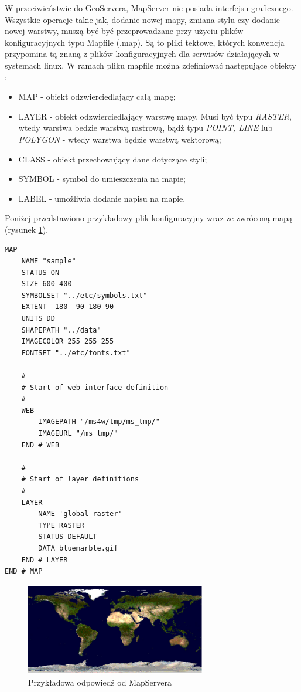 W przeciwieństwie do GeoServera, MapServer nie posiada interfejsu graficznego. Wszystkie operacje takie jak,
dodanie nowej mapy, zmiana stylu czy dodanie nowej warstwy, muszą być być przeprowadzane przy użyciu plików
konfiguracyjnych typu Mapfile (.map). Są to pliki tektowe, których konwencja przypomina tą znaną z plików
konfiguracyjnych dla serwisów działających w systemach linux. W ramach pliku mapfile można zdefiniować następujące
obiekty \cite{MapServer2011}:
\begin{itemize}
    \item MAP - obiekt odzwierciedlający całą mapę;
    \item LAYER - obiekt odzwierciedlający warstwę mapy. Musi być typu \textit{RASTER}, wtedy warstwa bedzie warstwą rastrową,
        bądź typu \textit{POINT, LINE} lub \textit{POLYGON} - wtedy warstwa będzie warstwą wektorową;
    \item CLASS - obiekt przechowujący dane dotyczące styli;
    \item SYMBOL - symbol do umieszczenia na mapie;
    \item LABEL - umożliwia dodanie napisu na mapie.
\end{itemize}

Poniżej przedstawiono przykładowy plik konfiguracyjny wraz ze zwróconą mapą (rysunek \ref{fig:mapserver_config}).

\begin{lstlisting}[frame=L]
MAP
    NAME "sample"
    STATUS ON
    SIZE 600 400
    SYMBOLSET "../etc/symbols.txt"
    EXTENT -180 -90 180 90
    UNITS DD
    SHAPEPATH "../data"
    IMAGECOLOR 255 255 255
    FONTSET "../etc/fonts.txt"

    #
    # Start of web interface definition
    #
    WEB
        IMAGEPATH "/ms4w/tmp/ms_tmp/"
        IMAGEURL "/ms_tmp/"
    END # WEB

    #
    # Start of layer definitions
    #
    LAYER
        NAME 'global-raster'
        TYPE RASTER
        STATUS DEFAULT
        DATA bluemarble.gif
    END # LAYER
END # MAP
\end{lstlisting}

\begin{figure}[h!]
    \centering
    \includegraphics[width=0.7\textwidth]{img/mapserver_config.jpg}
    \caption{Przykładowa odpowiedź od MapServera}
    \label{fig:mapserver_config}
\end{figure}

